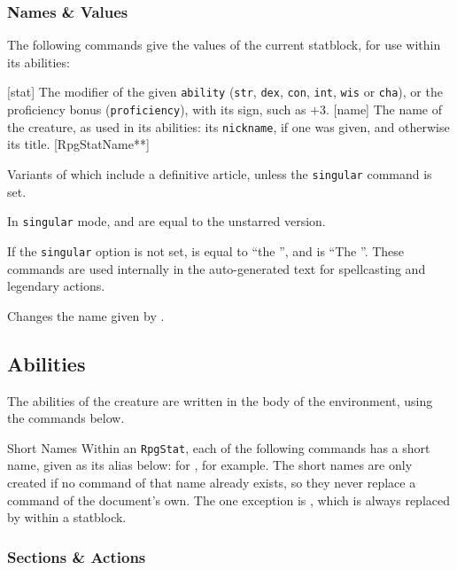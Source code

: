 		\subsubsection{Names \& Values}

			The following commands give the values of the current statblock, for use within its abilities:

			[stat]{}
			{
				The modifier of the given \texttt{ability} (\texttt{str}, \texttt{dex}, \texttt{con}, \texttt{int}, \texttt{wis} or \texttt{cha}), or the proficiency bonus (\texttt{proficiency}), with its sign, such as $+3$.
			}
			[name]
			{
				The name of the creature, as used in its abilities: its \texttt{nickname}, if one was given, and otherwise its title.
			}
			[RpgStatName**]
			{
				Variants of  which include a definitive article, unless the \texttt{singular} command is set.

				In \texttt{singular} mode,  and  are equal to the unstarred version.

				If the \texttt{singular} option is not set,  is equal to ``the \RpgStatName'', and  is ``The \RpgStatName''. These commands are used internally in the auto-generated text for spellcasting and legendary actions.
			}
			{
				Changes the name given by .
			}

	\subsection{Abilities}\label{S:DndStatAbilities}

		The abilities of the creature are written in the body of the environment, using the commands below.

		\begin{RpgSidebar}{Short Names}
			Within an \texttt{RpgStat}, each of the following commands has a short name, given as its alias below:  for , for example. The short names are only created if no command of that name already exists, so they never replace a command of the document's own. The one exception is , which is always replaced by  within a statblock.
		\end{RpgSidebar}

		\subsubsection{Sections \& Actions}



